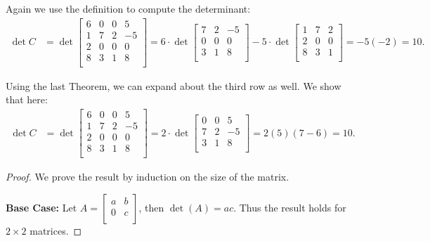\documentclass[12pt,letterpaper]{article}
\begin{document}
\begin{enumerate}
  \Answer Again we use the definition to compute the determinant:
  \begin{align*}
  	\det C& =\det \begin{bmatrix}
  6 & 0 & 0 & 5\\
  1 & 7 & 2 & -5\\
  2 & 0 & 0 & 0\\
  8 & 3 & 1 & 8\\
  \end{bmatrix}= 6\cdot \det \begin{bmatrix}
  7 & 2 & -5\\
  0 & 0 & 0\\
  3 & 1 & 8\\
\end{bmatrix}-5\cdot \det \begin{bmatrix}
1 & 7 & 2\\
2 & 0 & 0\\
8 & 3 & 1\\
\end{bmatrix}=-5(-2)=10.
\end{align*}

Using the last Theorem, we can expand about the third row as well. We show that here:
  \begin{align*}
	\det C& =\det \begin{bmatrix}
		6 & 0 & 0 & 5\\
		1 & 7 & 2 & -5\\
		2 & 0 & 0 & 0\\
		8 & 3 & 1 & 8\\
	\end{bmatrix}= 2\cdot \det \begin{bmatrix}
		0 & 0 & 5\\
		7 & 2 & -5\\
		3 & 1 & 8\\
\end{bmatrix}
=2(5)(7-6)=10.
\end{align*}


  \Answer 
  
  \begin{proof}
  We prove the result by induction on the size of the matrix.
  
  {\bf Base Case:} Let $A=\begin{bmatrix} a & b\\ 0 & c\\ \end{bmatrix}$, then $\det(A)=ac$. Thus the result holds for $2\times 2$ matrices.
  

\end{proof}
\end{enumerate}
\end{document}
